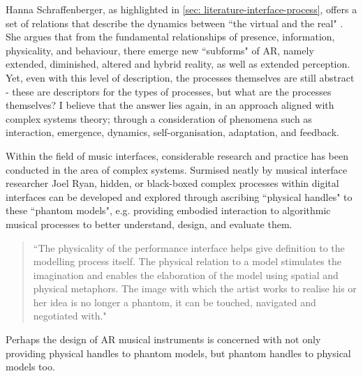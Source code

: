 Hanna Schraffenberger, as highlighted in \autoref{sec: literature-interface-process}, offers a set of relations that describe the dynamics between ``the virtual and the real" \citeyearpar{schraffenberger2018}. She argues that from the fundamental relationships of presence, information, physicality, and behaviour, there emerge new ``subforms" of AR, namely extended, diminished, altered and hybrid reality, as well as extended perception. Yet, even with this level of description, the processes themselves are still abstract - these are descriptors for the types of processes, but what are the processes themselves? I believe that the answer lies again, in an approach aligned with complex systems theory; through a consideration of phenomena such as interaction, emergence, dynamics, self-organisation, adaptation, and feedback.

Within the field of music interfaces, considerable research and practice has been conducted in the area of complex systems. Surmised neatly by musical interface researcher Joel Ryan, hidden, or black-boxed complex processes within digital interfaces can be developed and explored through ascribing ``physical handles" to these ``phantom models", e.g. providing embodied interaction to algorithmic musical processes to better understand, design, and evaluate them.
\begin{quote}
    ``The physicality of the performance interface helps give definition to the modelling process itself. The physical relation to a model stimulates the imagination and enables the elaboration of the model using spatial and physical metaphors. The image with which the artist works to realise his or her idea is no longer a phantom, it can be touched, navigated and negotiated with." \citeyearpar[p.5]{ryan1991}
\end{quote}
Perhaps the design of AR musical instruments is concerned with not only providing physical handles to phantom models, but phantom handles to physical models too.

